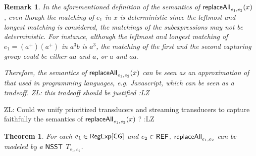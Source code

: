 \documentclass[sigplan,review,anonymous]{acmart}\settopmatter{printfolios=true,printccs=false,printacmref=false}
\newcommand{\zhilin}[1]{\color{brown} {ZL: #1 :LZ} \color{black}}
\newcommand{\zhilin}[1]{}
\newtheorem{theorem}{Theorem}
\newtheorem{remark}{Remark}
\newcommand\NSST{{\sf NSST}}
\newcommand\refexp{{\sf REF}}
\begin{document}
\begin{remark}
  In the aforementioned definition of the semantics of $\mathsf{replaceAll}_{e_1,e_2}(x)$, even though the matching of $e_1$ in $x$ is deterministic since the leftmost and longest matching is considered, the matchings of the subexpressions may not be deterministic. For instance, although the leftmost and longest matching of $e_1 = (a^+) 
  (a^+) $ in $a^3b$ is $a^3$, the matching of the first and the second capturing group could be either $aa$ and $a$, or $a$ and $aa$.
  
Therefore, the semantics of $\mathsf{replaceAll}_{e_1,e_2}(x)$ can be seen as an approximation of that used in programming languages, e.g. Javascript, which can be seen as a tradeoff. \zhilin{this tradeoff should be justified}
\end{remark}

\zhilin{Could we unify prioritized transducers and streaming transducers to capture faithfully the semantics of $\mathsf{replaceAll}_{e_1,e_2}(x)$ ?}

\begin{theorem}
  For each $e_1 \in {\sf RegExp}[\sf CG]$ and $e_2 \in \refexp$, $\mathsf{replaceAll}_{e_1, e_2}$ can be modeled by a $\NSST${} $T_{e_1,e_2}$.
\end{theorem}
\end{document}
